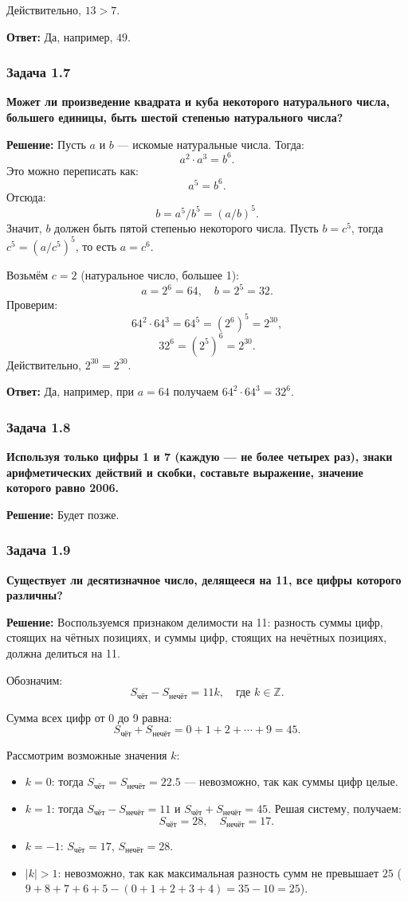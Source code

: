 \documentclass[12pt, a4paper]{article}
\begin{document}
Действительно, $13 > 7$.

\textbf{Ответ:} Да, например, $49$.

\subsubsection*{Задача 1.7}
\textbf{Может ли произведение квадрата и куба некоторого натурального числа, большего единицы, быть шестой степенью натурального числа?}

\textbf{Решение:}
Пусть $a$ и $b$ — искомые натуральные числа. Тогда:
\[
a^2 \cdot a^3 = b^6.
\]
Это можно переписать как:
\[
a^5 = b^6.
\]
Отсюда:
\[
b = a^5/b^5 = (a/b)^5.
\]
Значит, $b$ должен быть пятой степенью некоторого числа. Пусть $b = c^5$, тогда $c^5 = (a/c^5)^5$, то есть $a = c^6$.


Возьмём $c = 2$ (натуральное число, большее 1):
\[
a = 2^6 = 64,\quad b = 2^5 = 32.
\]
Проверим:
\[
64^2 \cdot 64^3 = 64^5 = (2^6)^5 = 2^{30},
\]
\[
32^6 = (2^5)^6 = 2^{30}.
\]
Действительно, $2^{30} = 2^{30}$.

\textbf{Ответ:} Да, например, при $a = 64$ получаем $64^2 \cdot 64^3 = 32^6$.

\subsubsection*{Задача 1.8}
\textbf{Используя только цифры 1 и 7 (каждую — не более четырех раз), знаки арифметических действий и скобки, составьте выражение, значение которого равно 2006.}

\textbf{Решение:}
Будет позже.

\subsubsection*{Задача 1.9}
\textbf{Существует ли десятизначное число, делящееся на 11, все цифры которого различны?}

\textbf{Решение:}
Воспользуемся признаком делимости на 11: разность суммы цифр, стоящих на чётных позициях, и суммы цифр, стоящих на нечётных позициях, должна делиться на 11.

Обозначим:
\[
S_{\text{чёт}} - S_{\text{нечёт}} = 11k,\quad \text{где } k \in \mathbb{Z}.
\]

Сумма всех цифр от 0 до 9 равна:
\[
S_{\text{чёт}} + S_{\text{нечёт}} = 0 + 1 + 2 + \cdots + 9 = 45.
\]

Рассмотрим возможные значения $k$:
\begin{itemize}
    \item $k = 0$: тогда $S_{\text{чёт}} = S_{\text{нечёт}} = 22.5$ — невозможно, так как суммы цифр целые.
    \item $k = 1$: тогда $S_{\text{чёт}} - S_{\text{нечёт}} = 11$ и $S_{\text{чёт}} + S_{\text{нечёт}} = 45$. Решая систему, получаем:
    \[
    S_{\text{чёт}} = 28,\quad S_{\text{нечёт}} = 17.
    \]
    \item $k = -1$: $S_{\text{чёт}} = 17$, $S_{\text{нечёт}} = 28$.
    \item $|k| > 1$: невозможно, так как максимальная разность сумм не превышает $25$ ($9+8+7+6+5 - (0+1+2+3+4) = 35-10=25$).
\end{itemize}
\end{document}
